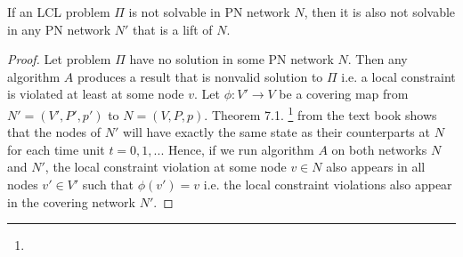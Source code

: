 \begin{theorem} \label{thm:lcl_nonsolvability:2}
If an LCL problem $\Pi$ is not solvable in PN network $N$, then it is also not solvable in any PN network $N'$ that is a lift of $N$.
\end{theorem}
\begin{proof}
    Let problem $\Pi$ have no solution in some PN network $N$.
    Then any algorithm $A$ produces a result that is nonvalid solution to $\Pi$ i.e. a local constraint is violated at least at some node $v$.
    Let $\phi: V' \rightarrow V$ be a covering map from $N'=(V', P', p')$ to $N=(V, P, p)$.
    Theorem 7.1. \footnote{} from the text book \cite{HirvonenSuomelaDistAlg2020} shows that the nodes of $N'$ will have exactly the same state as their counterparts at $N$ for each time unit $t=0,1,...$
    Hence, if we run algorithm $A$ on both networks $N$ and $N'$, the local constraint violation at some node $v \in N$ also appears in all nodes $v' \in V'$ such that $\phi(v') = v$ i.e. the local constraint violations also appear in the covering network $N'$.
\end{proof}

